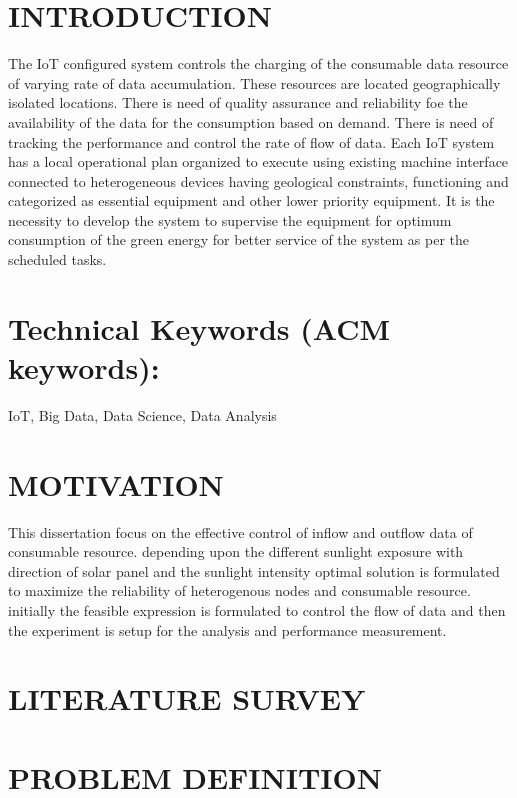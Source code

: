 \documentclass[a4paper, 12pt, notitlepage]{article}
\begin{document}
\section{INTRODUCTION}

The IoT configured system controls the charging of the consumable data resource of varying rate of data accumulation. These resources are located geographically isolated locations. There is need of quality assurance and reliability foe the availability of the data for the consumption based on demand. There is need of tracking the performance and control the rate of flow of data. Each IoT system has a local operational plan organized to execute using existing machine interface connected to heterogeneous devices having geological constraints, functioning and categorized as essential equipment and other lower priority equipment. It is the necessity to develop the system to supervise the equipment for optimum consumption of the green energy for better service of the system as per the scheduled tasks.

\section{Technical Keywords (ACM keywords):}

\large{IoT, Big Data, Data Science, Data Analysis}

\section{MOTIVATION}

This dissertation focus on the effective control of inflow and outflow data of consumable resource. depending upon the different sunlight exposure with direction of solar panel and the sunlight intensity optimal solution is formulated to maximize the reliability of heterogenous nodes and consumable resource. initially the feasible expression is formulated to control the flow of data and then the experiment is setup for the analysis and performance measurement.


\section{LITERATURE SURVEY}



\section{PROBLEM DEFINITION}
\end{document}
